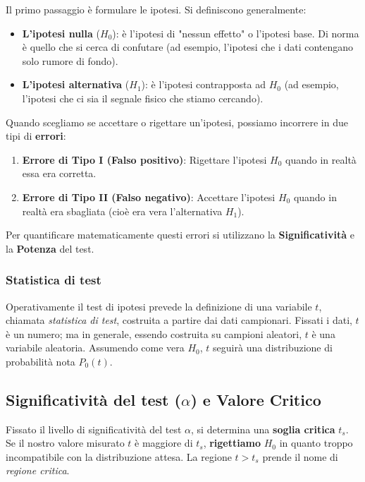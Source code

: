 \documentclass[openany,a4paper,12pt]{book}
\theoremstyle{remark}
\begin{document}
Il primo passaggio è formulare le ipotesi. Si definiscono generalmente:
\begin{itemize}
    \item \textbf{L'ipotesi nulla} ($H_0$): è l'ipotesi di "nessun effetto" o l'ipotesi base. Di norma è quello che si cerca di confutare (ad esempio, l'ipotesi che i dati contengano solo rumore di fondo).
    \item \textbf{L'ipotesi alternativa} ($H_1$): è l'ipotesi contrapposta ad $H_0$ (ad esempio, l'ipotesi che ci sia il segnale fisico che stiamo cercando).
\end{itemize}

Quando scegliamo se accettare o rigettare un'ipotesi, possiamo incorrere in due tipi di \textbf{errori}:
\begin{enumerate}
    \item \textbf{Errore di Tipo I (Falso positivo)}: Rigettare l'ipotesi $H_0$ quando in realtà essa era corretta.
    \item \textbf{Errore di Tipo II (Falso negativo)}: Accettare l'ipotesi $H_0$ quando in realtà era sbagliata (cioè era vera l'alternativa $H_1$).
\end{enumerate}

Per quantificare matematicamente questi errori si utilizzano la \textbf{Significatività} e la \textbf{Potenza} del test.

\subsubsection*{Statistica di test}
Operativamente il test di ipotesi prevede la definizione di una variabile $t$, chiamata \textit{statistica di test}, costruita a partire dai dati campionari. Fissati i dati, $t$ è un numero; ma in generale, essendo costruita su campioni aleatori, $t$ è una variabile aleatoria. Assumendo come vera $H_0$, $t$ seguirà una distribuzione di probabilità nota $P_0(t)$.

\subsection*{Significatività del test ($\alpha$) e Valore Critico}
Fissato il livello di significatività del test $\alpha$, si determina una \textbf{soglia critica} $t_s$. Se il nostro valore misurato $t$ è maggiore di $t_s$, \textbf{rigettiamo} $H_0$ in quanto troppo incompatibile con la distribuzione attesa. La regione $t > t_s$ prende il nome di \textit{regione critica}.
\end{document}
